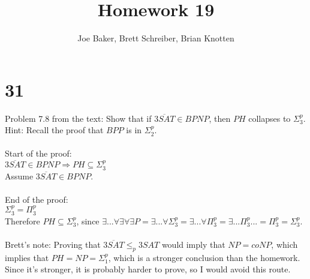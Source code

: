 \documentclass[letterpaper,notitlepage,twoside]{article}
\renewcommand{\implies}{\Rightarrow} %
\begin{document}
\title{Homework 19}
\author{Joe Baker, Brett Schreiber, Brian Knotten}
\maketitle

\section*{31}
Problem 7.8 from the text: Show that if $\overline{3SAT} \in BPNP$, then $PH$ collapses to $\Sigma_3^p$. \\
Hint: Recall the proof that $BPP$ is in $\Sigma_2^p$.
\\\\

Start of the proof: \\
$\overline{3SAT} \in BPNP \implies PH \subseteq \Sigma_3^p$ \\
Assume $\overline{3SAT} \in BPNP$. \\\\

End of the proof: \\
$\Sigma_3^p = \Pi_3^p$ \\
Therefore $PH \subseteq \Sigma_3^p$, since $\exists...\forall\exists\forall\exists P = \exists...\forall\Sigma_3^p = \exists...\forall\Pi_3^p = \exists...\Pi_3^p ... = \Pi_3^p = \Sigma_3^p$.
\\\\

Brett's note:
Proving that $\overline{3SAT} \leq_p 3SAT$ would imply that $NP = coNP$, which implies that $PH = NP = \Sigma_1^p$, which is a stronger conclusion than the homework. Since it's stronger, it is probably harder to prove, so I would avoid this route.
\end{document}
